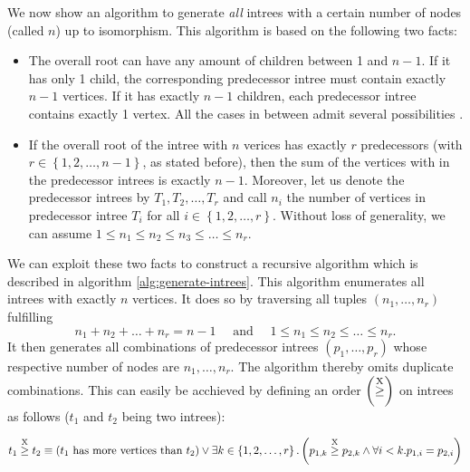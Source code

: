 We now show an algorithm to generate \emph{all} intrees with a certain number of nodes (called $n$) up to isomorphism. This algorithm is based on the following two facts: 

\begin{itemize}
  \item The overall root can have any amount of children between 1 and $n-1$. If it has only 1 child, the corresponding predecessor intree must contain exactly $n-1$ vertices. If it has exactly $n-1$ children, each predecessor intree contains exactly 1 vertex. All the cases in between admit several possibilities .
  \item If the overall root of the intree with $n$ verices has exactly $r$ predecessors (with $r \in \left\{ 1,2,\dots,n-1 \right\}$, as stated before), then the sum of the vertices with in the predecessor intrees is exactly $n-1$. Moreover, let us denote the predecessor intrees by $T_1,T_2,\dots,T_r$ and call $n_i$ the number of vertices in predecessor intree $T_i$ for all $i\in\left\{1,2,\dots,r \right\}$. Without loss of generality, we can assume $1 \leq n_1 \leq n_2 \leq n_3 \leq \dots \leq n_r$.
\end{itemize}

We can exploit these two facts to construct a recursive algorithm which is described in algorithm \ref{alg:generate-intrees}. This algorithm enumerates all intrees with exactly $n$ vertices. It does so by traversing all tuples $(n_1,\dots,n_r)$ fulfilling
\begin{equation*}
  n_1 + n_2 + \dots + n_r = n-1 \quad \text{ and } \quad 1\leq n_1\leq n_2\leq\dots\leq n_r.
\end{equation*}
It then generates all combinations of predecessor intrees $(p_1,\dots,p_r)$ whose respective number of nodes are $n_1,\dots,n_r$. The algorithm thereby omits duplicate combinations. This can easily be acchieved by defining an order $\left(\stackrel{\text{X}}{\geq}\right)$ on intrees as follows ($t_1$ and $t_2$ being two intrees):

\begin{equation}
  \label{eq:definition-treegeq}
  t_1 \stackrel{\text{X}}{\geq} t_2 \equiv (\text{$t_1$ has more vertices than $t_2$}) \vee \exists k \in \left\{ 1,2,\dots,r \right\}. \left( p_{1,k} \stackrel{\text{X}}{\geq} p_{2,k} \wedge \forall i<k. p_{1,i}=p_{2,i} \right)
\end{equation}


